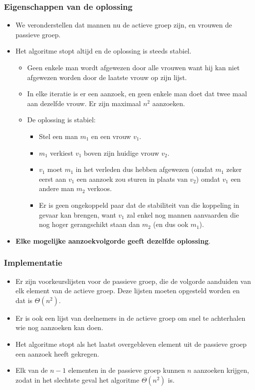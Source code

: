 \subsubsection{Eigenschappen van de oplossing}
\begin{itemize}
    \item We veronderstellen dat mannen nu de actieve groep zijn, en vrouwen de passieve groep. 
    \item Het algoritme stopt altijd en de oplossing is steeds stabiel.
    \begin{itemize}
        \item Geen enkele man wordt afgewezen door alle vrouwen want hij kan niet afgewezen worden door de laatste vrouw op zijn lijst.
        \item In elke iteratie is er een aanzoek, en geen enkele man doet dat twee maal aan dezelfde vrouw. Er zijn maximaal $n^2$ aanzoeken.
        \item De oplossing is stabiel: \begin{itemize}
            \item Stel een man $m_1$ en een vrouw $v_1$.
            \item $m_1$ verkiest $v_1$ boven zijn huidige vrouw $v_2$.
            \item $v_1$ moet $m_1$ in het verleden dus hebben afgewezen (omdat $m_1$ zeker eerst aan $v_1$ een aanzoek zou sturen in plaats van $v_2$) omdat $v_1$ een andere man $m_2$ verkoos.
            \item Er is geen ongekoppeld paar dat de stabiliteit van die koppeling in gevaar kan brengen, want $v_1$ zal enkel nog mannen aanvaarden die nog hoger gerangschikt staan dan $m_2$ (en dus ook $m_1$).
        \end{itemize} 
    \end{itemize}
    \item \textbf{Elke mogelijke aanzoekvolgorde geeft dezelfde oplossing}.
\end{itemize}

\subsubsection{Implementatie}
\begin{itemize}
    \item Er zijn voorkeurslijsten voor de passieve groep, die de volgorde aanduiden van elk element van de actieve groep. Deze lijsten moeten opgesteld  worden en dat is $\Theta(n^2)$.
    \item Er is ook een lijst van deelnemers in de actieve groep om snel te achterhalen wie nog aanzoeken kan doen.
    \item Het algoritme stopt als het laatst overgebleven element uit de passieve groep een aanzoek heeft gekregen.
    \item Elk van de $n-1$ elementen in de passieve groep kunnen $n$ aanzoeken krijgen, zodat in het slechtste geval het algoritme $\Theta(n^2)$ is.
\end{itemize}


